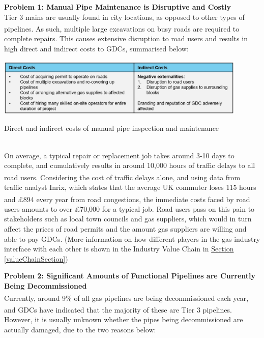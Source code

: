 \documentclass[11pt]{article}		%
\newcommand{\supercite}[1]{\textsuperscript{\cite{#1}}}		%
\newcommand{\sectref}[1]{\hyperref[#1]{Section \ref*{#1}}}     %
\begin{document}
    \textbf{Problem 1: Manual Pipe Maintenance is Disruptive and Costly}
    \\Tier 3 mains are usually found in city locations, as opposed to other types of pipelines\supercite{tier3hse}. As such, multiple large excavations on busy roads are required to complete repairs. This causes extensive disruption to road users and results in high direct and indirect costs to GDCs, summarised below:
    		\begin{table}[h]
			\centering
			\includegraphics[width=0.9\textwidth]{costs.jpg}
			\caption{Direct and indirect costs of manual pipe inspection and maintenance}
			\label{PipeInspectionCosts}
 		\end{table}
 	\vspace{-0.5cm}
 	\\
    \hspace*{2ex}On average, a typical repair or replacement job takes around 3-10 days to complete, and cumulatively results in around 10,000 hours of traffic delays to all road users\supercite{pipeinspection}. Considering the cost of traffic delays alone, and using data from traffic analyst Inrix, which states that the average UK commuter loses 115 hours and £894 every year from road congestions\supercite{trafficreport}, the immediate costs faced by road users amounts to over £70,000 for a typical job. Road users pass on this pain to stakeholders such as local town councils and gas suppliers, which would in turn affect the prices of road permits and the amount gas suppliers are willing and able to pay GDCs. (More information on how different players in the gas industry interface with each other is shown in the Industry Value Chain in \sectref{valueChainSection})
 	
    \textbf{Problem 2: Significant Amounts of Functional Pipelines are Currently Being Decommissioned}
    \\
    Currently, around 9\% of all gas pipelines are being decommissioned each year\supercite{decommission}, and GDCs have indicated that the majority of these are Tier 3 pipelines\supercite{decommission}. However, it is usually unknown whether the pipes being decommissioned are actually damaged, due to the two reasons below:
	
\end{document}
